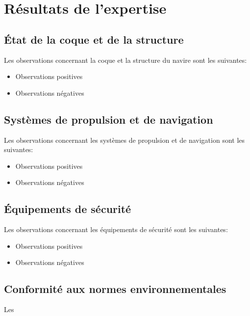 \documentclass[12pt,a4paper]{article}
\begin{document}
\section{Résultats de l'expertise}
\subsection{État de la coque et de la structure}
Les observations concernant la coque et la structure du navire sont les suivantes:
\begin{itemize}
    \item Observations positives
    \item Observations négatives
\end{itemize}

\subsection{Systèmes de propulsion et de navigation}
Les observations concernant les systèmes de propulsion et de navigation sont les suivantes:
\begin{itemize}
    \item Observations positives
    \item Observations négatives
\end{itemize}

\subsection{Équipements de sécurité}
Les observations concernant les équipements de sécurité sont les suivantes:
\begin{itemize}
    \item Observations positives
    \item Observations négatives
\end{itemize}

\subsection{Conformité aux normes environnementales}
Les
\end{document}
